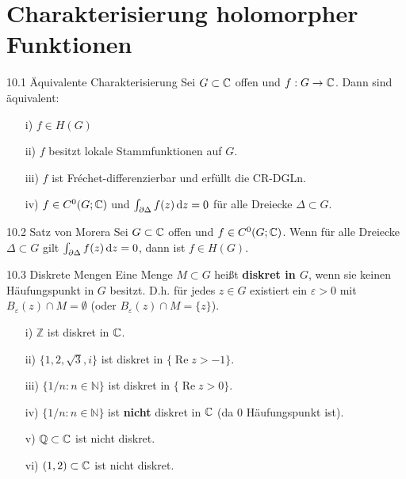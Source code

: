 \section{Charakterisierung holomorpher Funktionen}

\begin{satz}{10.1 Äquivalente Charakterisierung}
Sei $G \subset \mathbb{C}$ offen und $f: G \to \mathbb{C}$. Dann sind äquivalent:
\begin{itemize}
    \item[i)] $f \in H(G)$
    \item[ii)] $f$ besitzt lokale Stammfunktionen auf $G$.
    \item[iii)] $f$ ist Fréchet-differenzierbar und erfüllt die CR-DGLn.
    \item[iv)] $f \in C^0(G; \mathbb{C})$ und $\int_{\partial \Delta} f(z) \, \mathrm{d}z = 0$ für alle Dreiecke $\Delta \subset G$.
\end{itemize}
\end{satz}

\begin{satz}{10.2 Satz von Morera}
Sei $G \subset \mathbb{C}$ offen und $f \in C^0(G; \mathbb{C})$. Wenn für alle Dreiecke $\Delta \subset G$ gilt $\int_{\partial \Delta} f(z) \, \mathrm{d}z = 0$, dann ist $f \in H(G)$.
\end{satz}

\begin{defi}{10.3 Diskrete Mengen}
Eine Menge $M \subset G$ heißt \textbf{diskret in $G$}, wenn sie keinen Häufungspunkt in $G$ besitzt. D.h. für jedes $z \in G$ existiert ein $\varepsilon > 0$ mit $B_\varepsilon(z) \cap M = \emptyset$ (oder $B_\varepsilon(z) \cap M = \{z\}$).
\end{defi}

\begin{tcolorbox}[colback=white, colframe=black!70, title={Bsp. 10.5: Diskrete Mengen}]
\begin{itemize}
    \item[i)] $\mathbb{Z}$ ist diskret in $\mathbb{C}$.
    \item[ii)] $\{1, 2, \sqrt{3}, i\}$ ist diskret in $\{\operatorname{Re} z > -1\}$.
    \item[iii)] $\{1/n : n \in \mathbb{N}\}$ ist diskret in $\{\operatorname{Re} z > 0\}$.
    \item[iv)] $\{1/n : n \in \mathbb{N}\}$ ist \textbf{nicht} diskret in $\mathbb{C}$ (da $0$ Häufungspunkt ist).
    \item[v)] $\mathbb{Q} \subset \mathbb{C}$ ist nicht diskret.
    \item[vi)] $(1, 2) \subset \mathbb{C}$ ist nicht diskret.
\end{itemize}
\end{tcolorbox}

